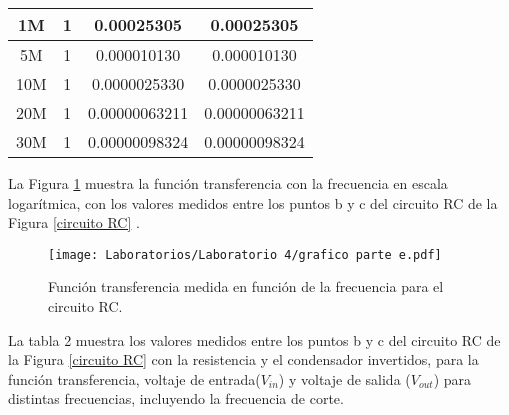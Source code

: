 \documentclass[letterpaper,11pt]{article} %
\begin{document}
\begin{center}
\begin{tabular}{|c|c|c|c|}
1M                           & 1                         & 0.00025305                 & 0.00025305           \\ \hline
5M                           & 1                         & 0.000010130                & 0.000010130          \\ \hline
10M                          & 1                         & 0.0000025330               & 0.0000025330         \\ \hline
20M                          & 1                         & 0.00000063211              & 0.00000063211        \\ \hline
30M                          & 1                         & 0.00000098324              & 0.00000098324        \\ \hline
\end{tabular}
\end{center}
La Figura \ref{parte e} muestra la función transferencia con la frecuencia en escala logarítmica, con los  valores medidos entre los puntos b y c del circuito RC de la Figura \ref{circuito RC} .
\begin{figure}
    \centering
    \texttt{[image: Laboratorios/Laboratorio 4/grafico parte e.pdf]}
    \caption{Función transferencia medida en función de la frecuencia para el circuito RC.}
    \label{parte e}
\end{figure}
La tabla 2 muestra los valores medidos entre los puntos b y c del circuito RC de la Figura \ref{circuito RC} con la resistencia y el condensador invertidos,  para la función transferencia, voltaje de entrada($V_{in}$) y voltaje de salida ($V_{out}$) para distintas frecuencias, incluyendo la frecuencia de corte.
\end{document}
